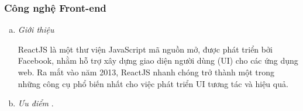 \subsubsection{Công nghệ Front-end}

    \begin{enumerate}[(a)]
        \item \textit{Giới thiệu}
        
            ReactJS là một thư viện JavaScript mã nguồn mở, được phát triển bởi Facebook, nhằm hỗ trợ xây dựng giao diện người dùng (UI) cho các ứng dụng web. Ra mắt vào năm 2013, ReactJS nhanh chóng trở thành một trong những công cụ phổ biến nhất cho việc phát triển UI tương tác và hiệu quả.
            
    

        
        \item \textit{Ưu điểm} \cite{React}.


\end{enumerate}
